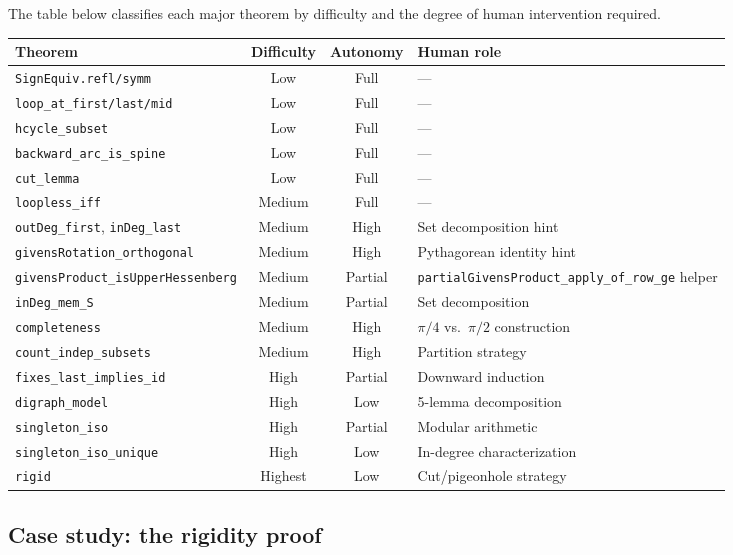 \begin{aiparagraph}
The table below classifies each major theorem by difficulty and the degree of
human intervention required.

\begin{center}
\renewcommand{\arraystretch}{1.2}
\footnotesize
\begin{tabular}{@{}p{5.4cm}ccl@{}}
\toprule
\textbf{Theorem} & \textbf{Difficulty} & \textbf{Autonomy} & \textbf{Human role} \\
\midrule
\texttt{SignEquiv.refl/symm} & Low & Full & --- \\
\texttt{loop\_at\_first/last/mid} & Low & Full & --- \\
\texttt{hcycle\_subset} & Low & Full & --- \\
\texttt{backward\_arc\_is\_spine} & Low & Full & --- \\
\texttt{cut\_lemma} & Low & Full & --- \\
\texttt{loopless\_iff} & Medium & Full & --- \\
\texttt{outDeg\_first}, \texttt{inDeg\_last} & Medium & High & Set decomposition hint \\
\texttt{givensRotation\_orthogonal} & Medium & High & Pythagorean identity hint \\
\texttt{givensProduct\_isUpperHessenberg} & Medium & Partial & \texttt{partialGivensProduct\_apply\_of\_row\_ge} helper \\
\texttt{inDeg\_mem\_S} & Medium & Partial & Set decomposition \\
\texttt{completeness} & Medium & High & $\pi/4$ vs.\ $\pi/2$ construction \\
\texttt{count\_indep\_subsets} & Medium & High & Partition strategy \\
\texttt{fixes\_last\_implies\_id} & High & Partial & Downward induction \\
\texttt{digraph\_model} & High & Low & 5-lemma decomposition \\
\texttt{singleton\_iso} & High & Partial & Modular arithmetic \\
\texttt{singleton\_iso\_unique} & High & Low & In-degree characterization \\
\texttt{rigid} & Highest & Low & Cut/pigeonhole strategy \\
\bottomrule
\end{tabular}
\end{center}
\end{aiparagraph}

\subsection{Case study: the rigidity proof}

